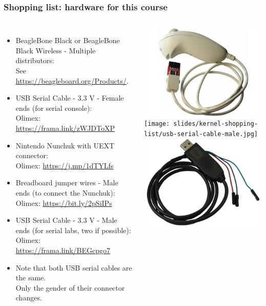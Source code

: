 \begin{frame}
\frametitle{Shopping list: hardware for this course}
  \begin{columns}
    \footnotesize
    \begin{itemize}
      \item BeagleBone Black or BeagleBone Black Wireless - Multiple distributors: \\
	    See \url{https://beagleboard.org/Products/}.
      \item USB Serial Cable - 3.3 V - Female ends (for serial console): \\
	    Olimex: \url{https://frama.link/zWJDToXP}
      \item Nintendo Nunchuk with UEXT connector: \\
            Olimex: \url{https://j.mp/1dTYLfs}
      \item Breadboard jumper wires - Male ends (to connect the Nunchuk): \\
	    Olimex: \url{https://bit.ly/2pSiIPs}
      \item USB Serial Cable - 3.3 V - Male ends (for serial labs, two if possible):\\
	    Olimex: \url{https://frama.link/BEGcpgo7}
      \item Note that both USB serial cables are the same.\\
            Only the gender of their connector changes.
    \end{itemize}
    \includegraphics[height=0.25\textheight]{common/nunchuk.jpg} \\
    \texttt{[image: slides/kernel-shopping-list/usb-serial-cable-male.jpg]} \\
    \includegraphics[height=0.20\textheight]{common/usb-serial-cable-female.png} \\

\end{columns}
\end{frame}
